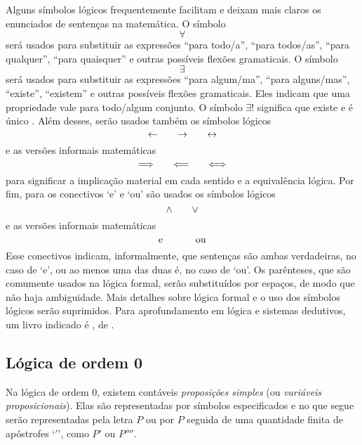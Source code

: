 Alguns símbolos lógicos frequentemente facilitam e deixam mais claros os enunciados de sentenças na matemática. O símbolo
	\begin{equation*}
	\forall
	\end{equation*}
será usados para substituir as expressões ``para todo/a'', ``para todos/as'', ``para qualquer'', ``para quaisquer'' e outras possíveis flexões gramaticais. O símbolo
	\begin{equation*}
	\exists
	\end{equation*}
será usados para substituir as expressões ``para algum/ma'', ``para alguns/mas'', ``existe'', ``existem'' e outras possíveis flexões gramaticais. Eles indicam que uma propriedade vale para todo/algum conjunto. O símbolo $\exists!$ significa que existe e é único%
. Além desses, serão usados também os símbolos lógicos
	\begin{equation*}
	\leftarrow \qquad \rightarrow \qquad \leftrightarrow
	\end{equation*}
e as versões informais matemáticas
	\begin{equation*}
	\quad \Longrightarrow \quad \quad \Longleftarrow \quad \quad \Longleftrightarrow \quad
	\end{equation*}
para significar a implicação material em cada sentido e a equivalência lógica. Por fim, para os conectivos `e' e `ou'  são usados os símbolos lógicos
	\begin{equation*}
	\land \qquad \lor
	\end{equation*}
e as versões informais matemáticas
	\begin{equation*}
	\text{\ \ e\ \ } \qquad \text{\ \ ou\ \ }
	\end{equation*}
Esse conectivos indicam, informalmente, que sentenças são ambas verdadeiras, no caso de `e', ou ao menos uma das duas é, no caso de `ou'. Os parênteses, que são comumente usados na lógica formal, serão substituídos por espaços, de modo que não haja ambiguidade. Mais detalhes sobre lógica formal e o uso dos símbolos lógicos serão suprimidos. Para aprofundamento em lógica e sistemas dedutivos, um livro indicado é , de \citeauthor{liv:Tarski-IntroductionLogic}.


\subsection{Lógica de ordem 0}

Na lógica de ordem $0$, existem contáveis \emph{proposições simples} (ou \emph{variáveis proposicionais}). Elas são representadas por símbolos especificados e no que segue serão representadas pela letra $P$ ou por $P$ seguida de uma quantidade finita de apóstrofes `$'$', como $P'$ ou $P''''$.

